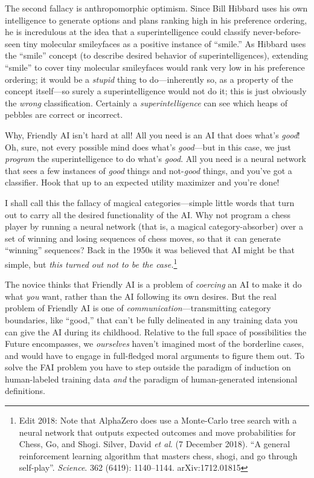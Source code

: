  The second fallacy is anthropomorphic optimism. Since Bill Hibbard
uses his own intelligence to generate options and plans ranking high in
his preference ordering, he is incredulous at the idea that a
superintelligence could classify never-before-seen tiny molecular
smileyfaces as a positive instance of
``smile.'' As Hibbard uses the
``smile'' concept (to describe
desired behavior of superintelligences), extending
``smile'' to cover tiny molecular
smileyfaces would rank very low in his preference ordering; it would be
a \textit{stupid} thing to do---inherently so, as a property of the
concept itself---so surely a superintelligence would not do it; this is
just obviously the \textit{wrong} classification. Certainly a
\textit{superintelligence} can see which heaps of pebbles are correct
or incorrect.


 Why, Friendly AI isn't hard at all! All you need
is an AI that does what's \textit{good}! Oh, sure, not
every possible mind does what's \textit{good}{}---but
in this case, we just \textit{program} the superintelligence to do
what's \textit{good}. All you need is a neural network
that sees a few instances of \textit{good} things and not-\textit{good}
things, and you've got a classifier. Hook that up to an
expected utility maximizer and you're done!


 I shall call this the fallacy of magical categories---simple
little words that turn out to carry all the desired functionality of
the AI. Why not program a chess player by running a neural network
(that is, a magical category-absorber) over a set of winning and losing
sequences of chess moves, so that it can generate
``winning'' sequences? Back in the
1950s it was believed that AI might be that simple, but \textit{this
turned out not to be the case.}\footnote{Edit 2018: Note that AlphaZero does use a Monte-Carlo tree search with a neural network that outputs expected outcomes and move probabilities for Chess, Go, and Shogi. Silver, David \textit{et al}. (7 December 2018). ``A general reinforcement learning algorithm that masters chess, shogi, and go through self-play''. \textit{Science}. 362 (6419): 1140–1144. arXiv:1712.01815}


 The novice thinks that Friendly AI is a problem of
\textit{coercing} an AI to make it do what \textit{you} want, rather
than the AI following its own desires. But the real problem of Friendly
AI is one of \textit{communication}{}---transmitting category
boundaries, like ``good,'' that
can't be fully delineated in any training data you can
give the AI during its childhood. Relative to the full space of
possibilities the Future encompasses, we \textit{ourselves}
haven't imagined most of the borderline cases, and
would have to engage in full-fledged moral arguments to figure them
out. To solve the FAI problem you have to step outside the paradigm of
induction on human-labeled training data \textit{and} the paradigm of
human-generated intensional definitions.


